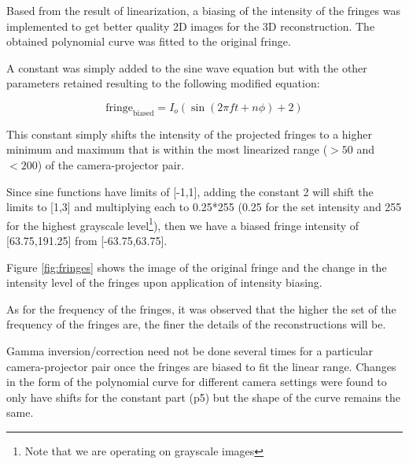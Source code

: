 Based from the result of linearization, a biasing of the intensity of the fringes was implemented to get better quality 2D images for the 3D reconstruction.
The obtained polynomial curve was fitted to the original fringe.

A constant was simply added to the sine wave equation but with the other parameters retained resulting to the following modified equation: 

\begin{equation}
\textrm{fringe}_\textrm{biased} = I_o(\sin(2\pi f t + n\phi) + 2)
\end{equation}

This constant simply shifts the intensity of the projected fringes to a higher minimum and maximum that is within the most linearized range ($>50$ and $<200$) of the camera-projector pair.

Since sine functions have limits of [-1,1], adding the constant 2 will shift the limits to [1,3] and multiplying each to 0.25*255 (0.25 for the set intensity and 255 for the highest grayscale level\footnote{Note that we are operating on grayscale images}), then we have a biased fringe intensity of [63.75,191.25] from [-63.75,63.75].

Figure \ref{fig:fringes} shows the image of the original fringe and the change in the intensity level of the fringes upon application of intensity biasing.

As for the frequency of the fringes, it was observed that the higher the set of the frequency of the fringes are, the finer the details of the reconstructions will be.

Gamma inversion/correction need not be done several times for a particular camera-projector pair once the fringes are biased to fit the linear range. Changes in the form of the polynomial curve for different camera settings were found to only have shifts for the constant part (p5) but the shape of the curve remains the same. 
